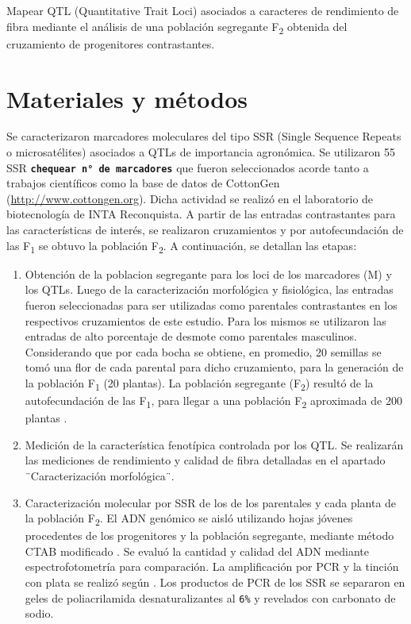 \documentclass[12pt,oneside]{reedthesis}
\begin{document}
Mapear QTL (Quantitative Trait Loci) asociados a caracteres de rendimiento de fibra mediante el análisis de una población segregante F\textsubscript{2} obtenida del cruzamiento de progenitores contrastantes.

\section{Materiales y métodos}\label{materiales-y-muxe9todos-2}

Se caracterizaron marcadores moleculares del tipo SSR (Single Sequence Repeats o microsatélites) asociados a QTLs de importancia agronómica. Se utilizaron 55 SSR \textbf{\texttt{chequear\ n°\ de\ marcadores}} que fueron seleccionados acorde tanto a trabajos científicos \autocite{zhang2005,shen2007,wang2007,wang2014,xia2014,wang2015,an2010,liu2012,qin2015,shi2015,su2016,zhang2016,ademe2017,liu2017,iqbal2017,li2017,baytar2018,liu2018} como la base de datos de CottonGen (\url{http://www.cottongen.org}). Dicha actividad se realizó en el laboratorio de biotecnología de INTA Reconquista. A partir de las entradas contrastantes para las características de interés, se realizaron cruzamientos y por autofecundación de las F\textsubscript{1} se obtuvo la población F\textsubscript{2}. A continuación, se detallan las etapas:

\begin{enumerate}
\def\labelenumi{\roman{enumi}.}
\item
  Obtención de la poblacion segregante para los loci de los marcadores (M) y los QTLs. Luego de la caracterización morfológica y fisiológica, las entradas fueron seleccionadas para ser utilizadas como parentales contrastantes en los respectivos cruzamientos de este estudio. Para los mismos se utilizaron las entradas de alto porcentaje de desmote como parentales masculinos. Considerando que por cada bocha se obtiene, en promedio, 20 semillas \autocite{naeem2017} se tomó una flor de cada parental para dicho cruzamiento, para la generación de la población F\textsubscript{1} (20 plantas). La población segregante (F\textsubscript{2}) resultó de la autofecundación de las F\textsubscript{1}, para llegar a una población F\textsubscript{2} aproximada de 200 plantas \autocite{bardak2018,zhang2003}.
\item
  Medición de la característica fenotípica controlada por los QTL. Se realizarán las mediciones de rendimiento y calidad de fibra detalladas en el apartado ¨Caracterización morfológica¨.
\item
  Caracterización molecular por SSR de los de los parentales y cada planta de la población F\textsubscript{2}. El ADN genómico se aisló utilizando hojas jóvenes procedentes de los progenitores y la población segregante, mediante método CTAB modificado \autocite{zhang2000,paterson1993}. Se evaluó la cantidad y calidad del ADN mediante espectrofotometría para comparación. La amplificación por PCR y la tinción con plata se realizó según \textcite{lin2005} . Los productos de PCR de los SSR se separaron en geles de poliacrilamida desnaturalizantes al \texttt{6\%} y revelados con carbonato de sodio\autocite{lin2005}.
\end{enumerate}
\end{document}
